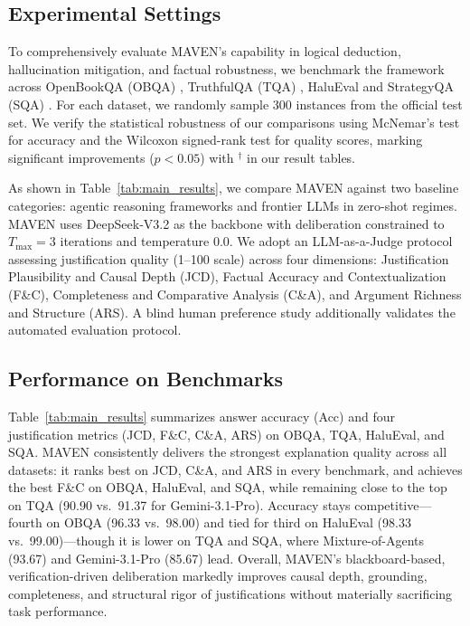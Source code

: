 \documentclass{article}
\begin{document}
\subsection{Experimental Settings}
\label{subsec:experimental_settings}

To comprehensively evaluate MAVEN's capability in logical deduction, hallucination mitigation, and factual robustness, we benchmark the framework across OpenBookQA (OBQA) \cite{mihaylov2018can}, TruthfulQA (TQA) \cite{lin2021truthfulqa}, HaluEval \cite{li2023halueval} and StrategyQA (SQA) \cite{geva2021did}. For each dataset, we randomly sample 300 instances from the official test set. We verify the statistical robustness of our comparisons using McNemar's test for accuracy and the Wilcoxon signed-rank test for quality scores, marking significant improvements ($p<0.05$) with $^\dagger$ in our result tables.

As shown in Table~\ref{tab:main_results}, we compare MAVEN against two baseline categories: agentic reasoning frameworks and frontier LLMs in zero-shot regimes. MAVEN uses DeepSeek-V3.2 as the backbone with deliberation constrained to $T_{\max}=3$ iterations and temperature 0.0. We adopt an LLM-as-a-Judge protocol assessing justification quality (1–100 scale) across four dimensions: Justification Plausibility and Causal Depth (JCD), Factual Accuracy and Contextualization (F\&C), Completeness and Comparative Analysis (C\&A), and Argument Richness and Structure (ARS). A blind human preference study additionally validates the automated evaluation protocol.

\subsection{Performance on Benchmarks}

Table~\ref{tab:main_results} summarizes answer accuracy (Acc) and four justification metrics (JCD, F\&C, C\&A, ARS) on OBQA, TQA, HaluEval, and SQA. MAVEN consistently delivers the strongest explanation quality across all datasets: it ranks best on JCD, C\&A, and ARS in every benchmark, and achieves the best F\&C on OBQA, HaluEval, and SQA, while remaining close to the top on TQA (90.90 vs.\ 91.37 for Gemini-3.1-Pro). Accuracy stays competitive—fourth on OBQA (96.33 vs.\ 98.00) and tied for third on HaluEval (98.33 vs.\ 99.00)—though it is lower on TQA and SQA, where Mixture-of-Agents (93.67) and Gemini-3.1-Pro (85.67) lead. Overall, MAVEN’s blackboard-based, verification-driven deliberation markedly improves causal depth, grounding, completeness, and structural rigor of justifications without materially sacrificing task performance.
\end{document}
